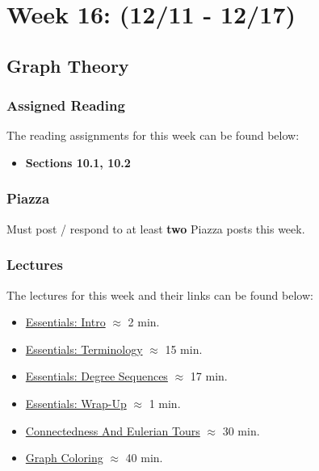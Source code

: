 \clearpage
\chapter{Week 16: (12/11 - 12/17)}

\section{Graph Theory}

\subsection{Assigned Reading}

The reading assignments for this week can be found below:

\begin{itemize}
    \item \textbf{Sections 10.1, 10.2}
\end{itemize}

\subsection{Piazza}

Must post / respond to at least \textbf{two} Piazza posts this week.  

\subsection{Lectures}

The lectures for this week and their links can be found below:

\begin{itemize}
    \item \href{https://applied.cs.colorado.edu/mod/hvp/view.php?id=51873}{Essentials: Intro} $\approx$ 2 min.
    \item \href{https://applied.cs.colorado.edu/mod/hvp/view.php?id=51874}{Essentials: Terminology} $\approx$ 15 min.
    \item \href{https://applied.cs.colorado.edu/mod/hvp/view.php?id=51875}{Essentials: Degree Sequences} $\approx$ 17 min.
    \item \href{https://applied.cs.colorado.edu/mod/hvp/view.php?id=51876}{Essentials: Wrap-Up} $\approx$ 1 min.
    \item \href{https://applied.cs.colorado.edu/mod/hvp/view.php?id=51877}{Connectedness And Eulerian Tours} $\approx$ 30 min.
    \item \href{https://applied.cs.colorado.edu/mod/hvp/view.php?id=51878}{Graph Coloring} $\approx$ 40 min.
\end{itemize}

